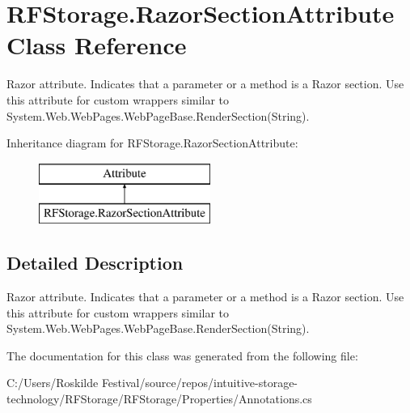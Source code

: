 \hypertarget{class_r_f_storage_1_1_razor_section_attribute}{}\section{R\+F\+Storage.\+Razor\+Section\+Attribute Class Reference}
\label{class_r_f_storage_1_1_razor_section_attribute}


Razor attribute. Indicates that a parameter or a method is a Razor section. Use this attribute for custom wrappers similar to {\ttfamily System.\+Web.\+Web\+Pages.\+Web\+Page\+Base.\+Render\+Section(\+String)}.  


Inheritance diagram for R\+F\+Storage.\+Razor\+Section\+Attribute\+:\begin{figure}[H]
\begin{center}
\leavevmode
\includegraphics[height=2.000000cm]{class_r_f_storage_1_1_razor_section_attribute}
\end{center}
\end{figure}


\subsection{Detailed Description}
Razor attribute. Indicates that a parameter or a method is a Razor section. Use this attribute for custom wrappers similar to {\ttfamily System.\+Web.\+Web\+Pages.\+Web\+Page\+Base.\+Render\+Section(\+String)}. 



The documentation for this class was generated from the following file\+:\begin{DoxyCompactItemize}
\item 
C\+:/\+Users/\+Roskilde Festival/source/repos/intuitive-\/storage-\/technology/\+R\+F\+Storage/\+R\+F\+Storage/\+Properties/Annotations.\+cs\end{DoxyCompactItemize}
